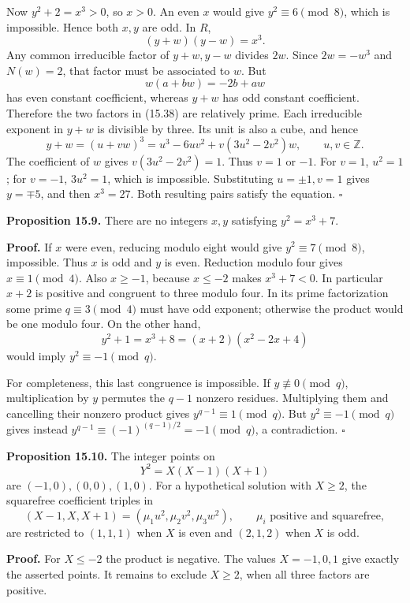\documentclass[
  11pt,
  a4paper,
]{article}
\begin{document}
Now \(y^2+2=x^3>0\), so \(x>0\). An even \(x\) would give
\(y^2\equiv6\pmod8\), which is impossible. Hence both \(x,y\) are odd.
In \(R\), \[
(y+w)(y-w)=x^3.
\tag{15.38}
\] Any common irreducible factor of \(y+w,y-w\) divides \(2w\). Since
\(2w=-w^3\) and \(N(w)=2\), that factor must be associated to \(w\). But
\[
w(a+bw)=-2b+aw
\] has even constant coefficient, whereas \(y+w\) has odd constant
coefficient. Therefore the two factors in (15.38) are relatively prime.
Each irreducible exponent in \(y+w\) is divisible by three. Its unit is
also a cube, and hence \[
y+w=(u+vw)^3
 =u^3-6uv^2+v(3u^2-2v^2)w,\qquad u,v\in\mathbb Z.
\tag{15.39}
\] The coefficient of \(w\) gives \(v(3u^2-2v^2)=1\). Thus \(v=1\) or
\(-1\). For \(v=1\), \(u^2=1\); for \(v=-1\), \(3u^2=1\), which is
impossible. Substituting \(u=\pm1,v=1\) gives \(y=\mp5\), and then
\(x^3=27\). Both resulting pairs satisfy the equation. \(\square\)

\textbf{Proposition 15.9.} There are no integers \(x,y\) satisfying
\(y^2=x^3+7\).

\textbf{Proof.} If \(x\) were even, reducing modulo eight would give
\(y^2\equiv7\pmod8\), impossible. Thus \(x\) is odd and \(y\) is even.
Reduction modulo four gives \(x\equiv1\pmod4\). Also \(x\ge-1\), because
\(x\le-2\) makes \(x^3+7<0\). In particular \(x+2\) is positive and
congruent to three modulo four. In its prime factorization some prime
\(q\equiv3\pmod4\) must have odd exponent; otherwise the product would
be one modulo four. On the other hand, \[
y^2+1=x^3+8=(x+2)(x^2-2x+4)
\tag{15.40}
\] would imply \(y^2\equiv-1\pmod q\).

For completeness, this last congruence is impossible. If
\(y\not\equiv0\pmod q\), multiplication by \(y\) permutes the \(q-1\)
nonzero residues. Multiplying them and cancelling their nonzero product
gives \(y^{q-1}\equiv1\pmod q\). But \(y^2\equiv-1\pmod q\) gives
instead \(y^{q-1}\equiv(-1)^{(q-1)/2}=-1\pmod q\), a contradiction.
\(\square\)

\textbf{Proposition 15.10.} The integer points on \[
Y^2=X(X-1)(X+1)
\tag{15.41}
\] are \((-1,0),(0,0),(1,0)\). For a hypothetical solution with
\(X\ge2\), the squarefree coefficient triples in \[
(X-1,X,X+1)=(\mu_1u^2,\mu_2v^2,\mu_3w^2),
\qquad \mu_i\text{ positive and squarefree},
\tag{15.42}
\] are restricted to \((1,1,1)\) when \(X\) is even and \((2,1,2)\) when
\(X\) is odd.

\textbf{Proof.} For \(X\le-2\) the product is negative. The values
\(X=-1,0,1\) give exactly the asserted points. It remains to exclude
\(X\ge2\), when all three factors are positive.
\end{document}
